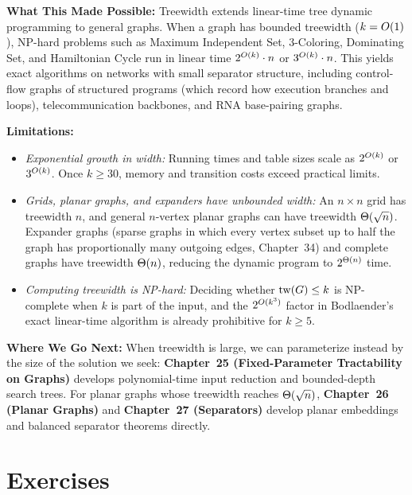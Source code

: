 \begin{connectionbox}
\textbf{What This Made Possible:}
Treewidth extends linear-time tree dynamic programming to general graphs. When a
graph has bounded treewidth ($k = O(1)$), NP-hard problems such as Maximum
Independent Set, $3$-Coloring, Dominating Set, and Hamiltonian Cycle run in linear
time $2^{O(k)}\cdot n$ or $3^{O(k)}\cdot n$. This yields exact algorithms on
networks with small separator structure, including control-flow graphs of structured
programs (which record how execution branches and loops), telecommunication
backbones, and RNA base-pairing graphs.

\textbf{Limitations:}
\begin{itemize}
  \item \emph{Exponential growth in width:} Running times and table sizes scale as
        $2^{O(k)}$ or $3^{O(k)}$. Once $k \ge 30$, memory and transition costs
        exceed practical limits.
  \item \emph{Grids, planar graphs, and expanders have unbounded width:} An
        $n\times n$ grid has treewidth $n$, and general $n$-vertex planar graphs can
        have treewidth $\Theta(\sqrt{n})$. Expander graphs (sparse graphs in which
        every vertex subset up to half the graph has proportionally many outgoing
        edges, Chapter~34) and complete graphs have treewidth $\Theta(n)$, reducing the
        dynamic program to $2^{\Theta(n)}$ time.
  \item \emph{Computing treewidth is NP-hard:} Deciding whether $\operatorname{tw}(G)\le k$ is
        NP-complete when $k$ is part of the input, and the $2^{O(k^3)}$ factor in
        Bodlaender's exact linear-time algorithm is already prohibitive for $k \ge 5$.
\end{itemize}

\textbf{Where We Go Next:}
When treewidth is large, we can parameterize instead by the size of the solution we
seek: \textbf{Chapter~25 (Fixed-Parameter Tractability on Graphs)} develops
polynomial-time input reduction and bounded-depth search trees. For planar graphs
whose treewidth reaches $\Theta(\sqrt{n})$, \textbf{Chapter~26 (Planar Graphs)} and
\textbf{Chapter~27 (Separators)} develop planar embeddings and balanced separator
theorems directly.
\end{connectionbox}

\section{Exercises}
\label{ch24:exercises}

